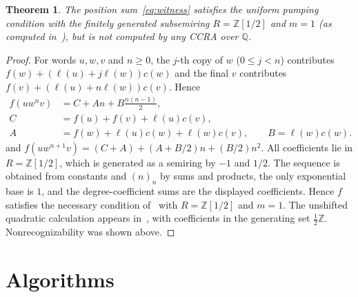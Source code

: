 \documentclass[11pt,letterpaper]{article}
\newcommand{\Q}{\mathbb{Q}}
\newcommand{\Z}{\mathbb{Z}}
\newtheorem{theorem}{Theorem}
\theoremstyle{definition}
\begin{document}
\begin{theorem}\label{thm:pumping}
The position sum~\eqref{eq:witness} satisfies the uniform pumping condition with the finitely generated subsemiring $R=\Z[1/2]$ and $m=1$ (as computed in~\cite[Example~26]{MPS26}), but is not computed by any CCRA over $\Q$.
\end{theorem}
\begin{proof}
For words $u,w,v$ and $n\ge0$, the $j$-th copy of $w$ ($0\le j<n$) contributes $f(w)+(\ell(u)+j\ell(w))c(w)$ and the final $v$ contributes $f(v)+(\ell(u)+n\ell(w))c(v)$. Hence
\[
\begin{aligned}
f(uw^nv)&=C+An+B\frac{n(n-1)}2,\\
C&=f(u)+f(v)+\ell(u)c(v),\\
A&=f(w)+\ell(u)c(w)+\ell(w)c(v),\qquad B=\ell(w)c(w).
\end{aligned}
\]
and $f(uw^{n+1}v)=(C+A)+(A+B/2)n+(B/2)n^2$. All coefficients lie in $R=\Z[1/2]$, which is generated as a semiring by $-1$ and $1/2$. The sequence is obtained from constants and $(n)_n$ by sums and products, the only exponential base is $1$, and the degree-coefficient sums are the displayed coefficients. Hence $f$ satisfies the necessary condition of~\cite[Theorem~15]{MPS26} with $R=\Z[1/2]$ and $m=1$. The unshifted quadratic calculation appears in~\cite[Appendix~B.4]{MPSfull}, with coefficients in the generating set $\tfrac12\Z$. Nonrecognizability was shown above.
\end{proof}



\section{Algorithms}\label{sec:algorithms}
\end{document}
